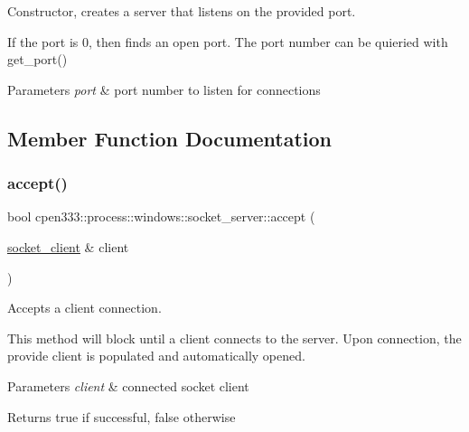 Constructor, creates a server that listens on the provided port. 

If the port is 0, then finds an open port. The port number can be quieried with get\+\_\+port()


\begin{DoxyParams}{Parameters}
{\em port} & port number to listen for connections \\
\hline
\end{DoxyParams}


\subsection{Member Function Documentation}
\mbox{\label{classcpen333_1_1process_1_1windows_1_1socket__server_aee5db9af683de8a0b26272a25661aa40}} 
\subsubsection{\texorpdfstring{accept()}{accept()}}
{\footnotesize\ttfamily bool cpen333\+::process\+::windows\+::socket\+\_\+server\+::accept (\begin{DoxyParamCaption}\item[{\hyperlink{classcpen333_1_1process_1_1windows_1_1socket__client}{socket\+\_\+client} \&}]{client }\end{DoxyParamCaption})\hspace{0.3cm}{\ttfamily [inline]}}



Accepts a client connection. 

This method will block until a client connects to the server. Upon connection, the provide client is populated and automatically opened.


\begin{DoxyParams}{Parameters}
{\em client} & connected socket client \\
\hline
\end{DoxyParams}
\begin{DoxyReturn}{Returns}
true if successful, false otherwise 
\end{DoxyReturn}
\mbox{\label{classcpen333_1_1process_1_1windows_1_1socket__server_a5eddf38d7b08e27f2299a750f16eae66}} 

